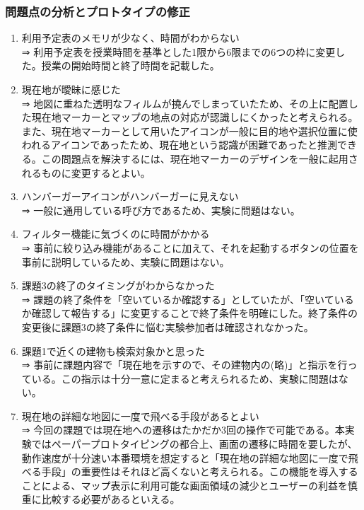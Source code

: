 \documentclass[12pt,a4paper,dvipdf]{jsarticle}
\begin{document}
\subsubsection{問題点の分析とプロトタイプの修正}
\begin{enumerate}
    \item 利用予定表のメモリが少なく、時間がわからない\\
          ⇒ 利用予定表を授業時間を基準とした1限から6限までの6つの枠に変更した。授業の開始時間と終了時間を記載した。
    \item 現在地が曖昧に感じた\\
          ⇒ 地図に重ねた透明なフィルムが撓んでしまっていたため、その上に配置した現在地マーカーとマップの地点の対応が認識しにくかったと考えられる。また、現在地マーカーとして用いたアイコンが一般に目的地や選択位置に使われるアイコンであったため、現在地という認識が困難であったと推測できる。この問題点を解決するには、現在地マーカーのデザインを一般に起用されるものに変更するとよい。
    \item ハンバーガーアイコンがハンバーガーに見えない\\
          ⇒ 一般に通用している呼び方であるため、実験に問題はない。
    \item フィルター機能に気づくのに時間がかかる\\
          ⇒ 事前に絞り込み機能があることに加えて、それを起動するボタンの位置を事前に説明しているため、実験に問題はない。
    \item 課題3の終了のタイミングがわからなかった\\
          ⇒ 課題の終了条件を「空いているか確認する」としていたが、「空いているか確認して報告する」に変更することで終了条件を明確にした。終了条件の変更後に課題3の終了条件に悩む実験参加者は確認されなかった。
    \item 課題1で近くの建物も検索対象かと思った\\
          ⇒ 事前に課題内容で「現在地を示すので、その建物内の(略)」と指示を行っている。この指示は十分一意に定まると考えられるため、実験に問題はない。
    \item 現在地の詳細な地図に一度で飛べる手段があるとよい\\
          ⇒ 今回の課題では現在地への遷移はたかだか3回の操作で可能である。本実験ではペーパープロトタイピングの都合上、画面の遷移に時間を要したが、動作速度が十分速い本番環境を想定すると「現在地の詳細な地図に一度で飛べる手段」の重要性はそれほど高くないと考えられる。この機能を導入することによる、マップ表示に利用可能な画面領域の減少とユーザーの利益を慎重に比較する必要があるといえる。

\end{enumerate}
\end{document}
